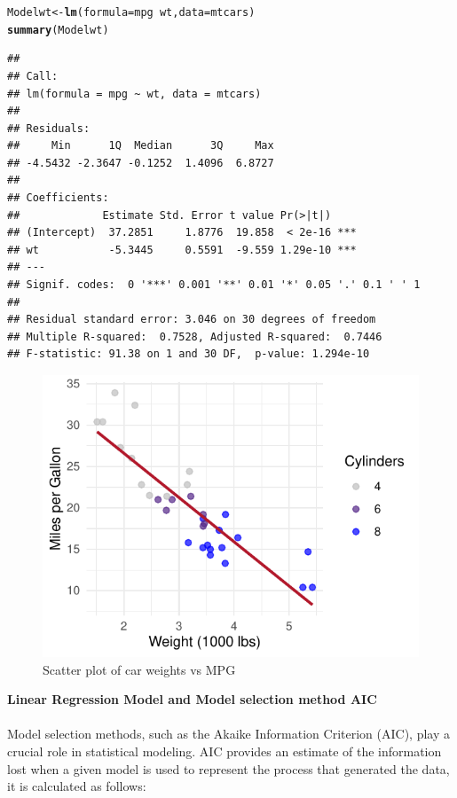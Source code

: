 \documentclass{article}\usepackage[]{graphicx}\usepackage[]{xcolor}
\makeatletter
\def\maxwidth{ %
  \ifdim\Gin@nat@width>\linewidth
    \linewidth
  \else
    \Gin@nat@width
  \fi
}
\newcommand{\hlopt}[1]{\textcolor[rgb]{0,0,0}{#1}}%
\newcommand{\hlstd}[1]{\textcolor[rgb]{0.345,0.345,0.345}{#1}}%
\newcommand{\hlkwb}[1]{\textcolor[rgb]{0.69,0.353,0.396}{#1}}%
\newcommand{\hlkwc}[1]{\textcolor[rgb]{0.333,0.667,0.333}{#1}}%
\newcommand{\hlkwd}[1]{\textcolor[rgb]{0.737,0.353,0.396}{\textbf{#1}}}%
\newenvironment{kframe}{%
 \def\at@end@of@kframe{}%
 \ifinner\ifhmode%
  \def\at@end@of@kframe{\end{minipage}}%
  \begin{minipage}{\columnwidth}%
 \fi\fi%
 \def\FrameCommand##1{\hskip\@totalleftmargin \hskip-\fboxsep
 \colorbox{shadecolor}{##1}\hskip-\fboxsep
     \hskip-\linewidth \hskip-\@totalleftmargin \hskip\columnwidth}%
 \MakeFramed {\advance\hsize-\width
   \@totalleftmargin\z@ \linewidth\hsize
   \@setminipage}}%
 {\par\unskip\endMakeFramed%
 \at@end@of@kframe}
\newenvironment{knitrout}{}{} %
\makeatother
\begin{document}
\begin{knitrout}\scriptsize
{}\color{fgcolor}\begin{kframe}
\begin{alltt}
\hlstd{Modelwt} \hlkwb{<-} \hlkwd{lm}\hlstd{(}\hlkwc{formula} \hlstd{= mpg} \hlopt{~} \hlstd{wt,} \hlkwc{data} \hlstd{= mtcars)}
\hlkwd{summary}\hlstd{(Modelwt)}
\end{alltt}
\begin{verbatim}
## 
## Call:
## lm(formula = mpg ~ wt, data = mtcars)
## 
## Residuals:
##     Min      1Q  Median      3Q     Max 
## -4.5432 -2.3647 -0.1252  1.4096  6.8727 
## 
## Coefficients:
##             Estimate Std. Error t value Pr(>|t|)    
## (Intercept)  37.2851     1.8776  19.858  < 2e-16 ***
## wt           -5.3445     0.5591  -9.559 1.29e-10 ***
## ---
## Signif. codes:  0 '***' 0.001 '**' 0.01 '*' 0.05 '.' 0.1 ' ' 1
## 
## Residual standard error: 3.046 on 30 degrees of freedom
## Multiple R-squared:  0.7528,	Adjusted R-squared:  0.7446 
## F-statistic: 91.38 on 1 and 30 DF,  p-value: 1.294e-10
\end{verbatim}
\end{kframe}
\end{knitrout}

\begin{knitrout}\scriptsize
{}\color{fgcolor}\begin{figure}[H]

{\centering \includegraphics[width=\maxwidth]{figure/beamer-scatter-plot-1} 

}

\caption[Scatter plot of car weights vs MPG]{Scatter plot of car weights vs MPG}\label{fig:scatter-plot}
\end{figure}

\end{knitrout}
\noindent
\textbf{Linear Regression Model and Model selection method AIC}
\\  
\noindent 
\\Model selection methods, such as the Akaike Information Criterion (AIC), play a crucial role in statistical modeling. AIC provides an estimate of the information lost when a given model is used to represent the process that generated the data, it is calculated as follows: 
\end{document}
